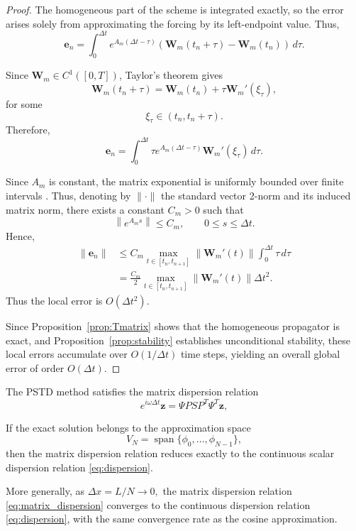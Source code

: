 \documentclass{Configuration_Files/PoliMi3i_thesis}
\begin{document}
\begin{proof}
The homogeneous part of the scheme is integrated exactly, so the error arises
solely from approximating the forcing by its left-endpoint value. Thus,
\begin{equation*}
\mathbf e_n
=
\int_0^{\Delta t}
e^{A_m(\Delta t-\tau)}
\left(
\mathbf W_m(t_n+\tau)
-
\mathbf W_m(t_n)
\right)
\,d\tau.
\end{equation*}

Since $\mathbf W_m\in C^1([0,T])$, Taylor's theorem gives
\begin{equation*}
\mathbf W_m(t_n+\tau)
=
\mathbf W_m(t_n)
+
\tau\mathbf W_m'(\xi_\tau),
\end{equation*}
for some
\begin{equation*}
\xi_\tau\in(t_n,t_n+\tau).
\end{equation*}
Therefore,
\begin{equation*}
\mathbf e_n
=
\int_0^{\Delta t}
\tau
e^{A_m(\Delta t-\tau)}
\mathbf W_m'(\xi_\tau)
\,d\tau.
\end{equation*}

Since $A_m$ is constant, the matrix exponential is uniformly bounded over finite intervals \cite{quarteroni_numerical_2014}. Thus, denoting by $\|\cdot\|$ the standard vector 2-norm and its induced matrix norm, there exists a constant $C_m>0$ such that
\begin{equation*}
\left\|
e^{A_ms}
\right\|
\le
C_m,
\qquad
0\le s\le\Delta t.
\end{equation*}
Hence,
\begin{align*}
\|\mathbf e_n\|
&\le
C_m
\max_{t\in[t_n,t_{n+1}]}
\|\mathbf W_m'(t)\|
\int_0^{\Delta t}\tau\,d\tau\\
&=
\frac{C_m}{2}
\max_{t\in[t_n,t_{n+1}]}
\|\mathbf W_m'(t)\|
\Delta t^2.
\end{align*}
Thus the local error is $O(\Delta t^2)$.

Since Proposition~\ref{prop:Tmatrix} shows that the homogeneous propagator is
exact, and Proposition~\ref{prop:stability} establishes unconditional
stability, these local errors accumulate over $O(1/\Delta t)$ time steps,
yielding an overall global error of order $O(\Delta t)$.
\end{proof}

\begin{proposition}
The PSTD method satisfies the matrix dispersion relation
\begin{equation}
e^{i\omega\Delta t}\mathbf z
=
\Psi
P
S
P^T
\Psi^T
\mathbf z,
\label{eq:matrix_dispersion}
\end{equation}

If the exact solution belongs to the approximation space
\[
V_N
=
\operatorname{span}
\{\phi_0,\ldots,\phi_{N-1}\},
\]
then the matrix dispersion relation reduces exactly to the continuous scalar
dispersion relation
\eqref{eq:dispersion}.

More generally, as
\(
\Delta x=L/N\rightarrow0,
\)
the matrix dispersion relation \eqref{eq:matrix_dispersion} converges to the continuous dispersion relation \eqref{eq:dispersion},
with the same convergence rate as the cosine approximation.
\end{proposition}
\end{document}
